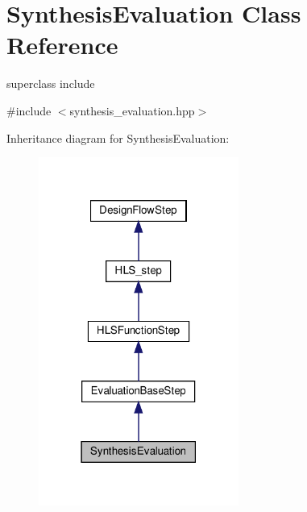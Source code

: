 \hypertarget{classSynthesisEvaluation}{}\section{Synthesis\+Evaluation Class Reference}
\label{classSynthesisEvaluation}


superclass include  




{\ttfamily \#include $<$synthesis\+\_\+evaluation.\+hpp$>$}



Inheritance diagram for Synthesis\+Evaluation\+:
\nopagebreak
\begin{figure}[H]
\begin{center}
\leavevmode
\includegraphics[width=186pt]{de/de1/classSynthesisEvaluation__inherit__graph}
\end{center}
\end{figure}


